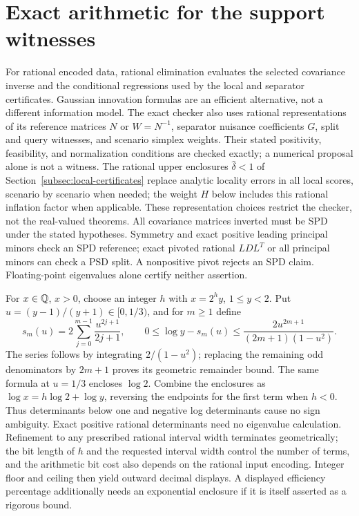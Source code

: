 \section{Exact arithmetic for the support witnesses}
\label{app:certificate-arithmetic}

For rational encoded data, rational elimination evaluates the selected
covariance inverse and the conditional regressions used by the local and
separator certificates. Gaussian innovation formulas are an efficient
alternative, not a different information model. The exact checker also uses
rational representations of its reference matrices $N$ or $W=N^{-1}$,
separator nuisance coefficients $G$, split and query witnesses, and scenario
simplex weights. Their stated positivity, feasibility, and normalization
conditions are checked exactly; a numerical proposal alone is not a witness.
The rational upper enclosures $\widehat\delta<1$ of
Section~\ref{subsec:local-certificates} replace analytic locality errors in
all local scores, scenario by scenario when needed; the weight $H$ below
includes this rational inflation factor when applicable. These
representation choices restrict the checker, not the real-valued theorems.
All covariance matrices inverted must be SPD under the stated hypotheses.
Symmetry and exact positive leading principal minors check an SPD reference;
exact pivoted rational $LDL^T$ or all principal minors can check a PSD split.
A nonpositive pivot rejects an SPD claim. Floating-point eigenvalues alone
certify neither assertion.

For $x\in\mathbb Q$, $x>0$, choose an integer $h$ with $x=2^h y$,
$1\le y<2$. Put $u=(y-1)/(y+1)\in[0,1/3)$, and for $m\ge1$ define
\begin{equation}\label{eq:rational-log}
 s_m(u)=2\sum_{j=0}^{m-1}\frac{u^{2j+1}}{2j+1},\qquad
 0\le\log y-s_m(u)\le
 \frac{2u^{2m+1}}{(2m+1)(1-u^2)}.
\end{equation}
The series follows by integrating $2/(1-u^2)$; replacing the remaining
odd denominators by $2m+1$ proves its geometric remainder bound.
The same formula at $u=1/3$ encloses $\log2$. Combine the enclosures as
$\log x=h\log2+\log y$, reversing the endpoints for the first term when
$h<0$. Thus determinants below one and negative log determinants cause no
sign ambiguity. Exact positive rational determinants need no eigenvalue
calculation. Refinement to any prescribed rational interval width terminates
geometrically; the bit length of $h$ and the requested interval width control
the number of terms, and the arithmetic bit cost also depends on the rational
input encoding. Integer floor and ceiling then yield outward decimal
displays. A displayed efficiency percentage additionally needs an exponential
enclosure if it is itself asserted as a rigorous bound.


